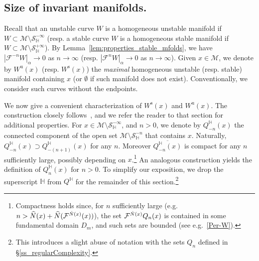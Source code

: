 \documentclass[10pt]{amsart}
\theoremstyle{definition}\newtheorem{defi}[theo]{Definition}\newtheorem{rema}[theo]{Remark}\newtheorem{exam}[theo]{Example}\newtheorem{exem}[theo]{Example}\newtheorem{nota}[theo]{Notation}
\newcommand{\unstable}{\text{u}}
\newcommand{\stable}{\text{s}}
\newcommand{\homo}{\mathbb{H}}
\newcommand{\cm}{\mathcal{F}}
\newcommand{\csp}{\mathcal{M}}
\newcommand{\Ws}{W^{\stable}}
\newcommand{\Wu}{W^{\unstable}}
\newcommand{\singPrivate}{\mathcal{S}}
\newcommand{\hsing}[1]{{\singPrivate}_\homo^{#1}}
\newcommand{\adm}{_{\alpha^{+}}}
\newcommand{\Np}{\hat N}
\newcommand{\Dom}{D}
\renewcommand{\adm}{_{\alpha}}
\let\oldhat\hat
\renewcommand*{\hat}[1]{\mathchoice{\widehat{#1}}{\widehat{#1}}{\oldhat{#1}}{\oldhat{#1}}}
\begin{document}
\subsection{Size of invariant manifolds.}\label{SSInvMan}
Recall that an unstable curve $W$ is a homogeneous unstable manifold if $W\subset\csp\setminus\hsing{-\infty}$ (resp. a stable curve $W$ is a homogeneous stable manifold if $W\subset\csp\setminus\hsing{+\infty}$). By Lemma~\ref{lem:properties_stable_mfolds}, we have $|\cm^{-n}W|\adm\to 0$ as $n\to\infty$ (resp. $|\cm^{n}W|\adm\to 0$ as $n\to\infty$). Given $x\in \csp$, we denote by $\Wu(x)$ (resp. $\Ws(x)$) the \emph{maximal} homogeneous unstable (resp. stable) manifold containing $x$ (or $\emptyset$ if such manifold does not exist). Conventionally, we consider such curves without the endpoints.

We now give a convenient characterization of $\Ws(x)$ and $\Wu(x)$. The construction closely follows~\cite[\S4.11]{ChM}, and we refer the reader to that section for additional properties. For $x\in\csp\setminus\hsing{-\infty}$, and $n > 0$, we denote by $Q^{\homo}_{-n}(x)$ the connected component of the open set $\csp\setminus\hsing{-n}$ that contains $x$. Naturally, $Q^{\homo}_{-n}(x)\supset Q^{\homo}_{-(n+1)}(x)$ for any $n$. Moreover $\overline{Q^{\homo}_{-n}(x)}$ is compact for any $n$ sufficiently large, possibly depending on $x$.\footnote{Compactness holds since, for $n$ sufficiently large (e.g. $n > \Np(x)+\Np(\cm^{\Np(x)}(x))$), the set $\cm^{\Np(x)}Q_n(x)$ is contained in some fundamental domain $\Dom_{m}$, and such sets are bounded (see e.g.~\eqref{Per-W}).} An analogous construction yields the definition of $Q^{\homo}_{n}(x)$ for $n > 0$. To simplify our exposition, we drop the superscript $\homo$ from $Q^{\homo}$ for the remainder of this section.\footnote{This introduces a slight abuse of notation with the sets $Q_{n}$ defined in \S\ref{ss_regularComplexity}.}
\end{document}
